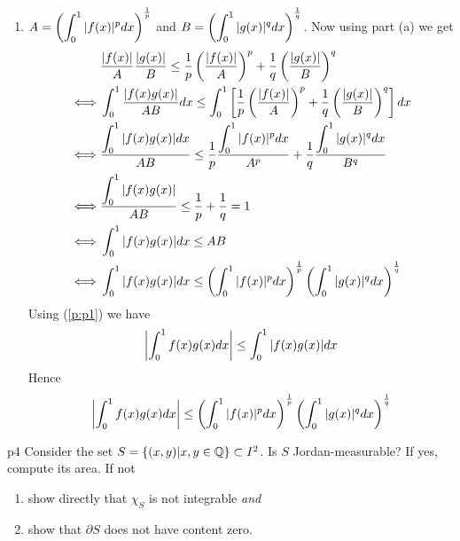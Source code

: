 \documentclass[a4paper, 11pt]{article}
\begin{document}
{\begin{enumerate}[label=(\alph*)]
\begin{align*}
	\end{align*}\Qed
	\item $A=\left(\displaystyle{\int_0^1|f(x)|^pdx}\right)^{\frac1p}$ and $B=\left(\displaystyle{\int_0^1|g(x)|^qdx}\right)^{\frac1q}$. Now using part (a) we get
	\begin{align*}
		     & \frac{|f(x)|}{A}\frac{ |g(x)| }{B}\leq \frac1p\left(\frac{ |f(x)| }{A}\right)^p+\frac1q\left(\frac{ |g(x)| }{B}\right)^q                         \\
		\iff & \int_0^1\frac{ |f(x)g(x)| }{AB}dx\leq \int_0^1\left[\frac1p\left(\frac{ |f(x)| }{A}\right)^p+\frac1q\left(\frac{ |g(x)| }{B}\right)^q\right]dx        \\
		\iff & \frac{ \displaystyle{\int_0^1|f(x)g(x)|} dx}{AB}\leq \frac1p\frac{\displaystyle{\int_0^1 |f(x)|^p dx}}{A^p}+\frac1q\frac{\displaystyle{\int_0^1 |g(x)|^qdx}}{B^q} \\
		\iff & \frac{ \displaystyle{\int_0^1|f(x)g(x)|} }{AB}\leq \frac1p+\frac1q=1                                                                            \\
		\iff & \int_0^1|f(x)g(x)|dx \leq AB                                                                                                           \\
		\iff & \int_0^1|f(x)g(x)|dx \leq  \left(\displaystyle{\int_0^1|f(x)|^pdx}\right)^{\frac1p}\left(\displaystyle{\int_0^1|g(x)|^qdx}\right)^{\frac1q}
	\end{align*}Using (\ref{p:p1}) we have $$\left|\int_0^1f(x)g(x)dx \right|\leq \int_0^1|f(x)g(x)|dx $$Hence $$\left|\int_0^1f(x)g(x)dx \right|\leq \left(\displaystyle{\int_0^1|f(x)|^pdx}\right)^{\frac1p}\left(\displaystyle{\int_0^1|g(x)|^qdx}\right)^{\frac1q}$$
	\end{enumerate}
}



\begin{problem}{%
}{p4%
}
Consider the set $S=\{(x,y)|x,y \in \mathbb{Q}\} \subset I^2$. Is $S$ Jordan-measurable? If yes, compute its area. If not \begin{enumerate}[label = (\alph*)]
	\item  show directly that $\chi_S$ is not integrable \emph{and} \item  show that $\partial S$ does not have content zero.
\end{enumerate}
\end{problem}
\end{document}
